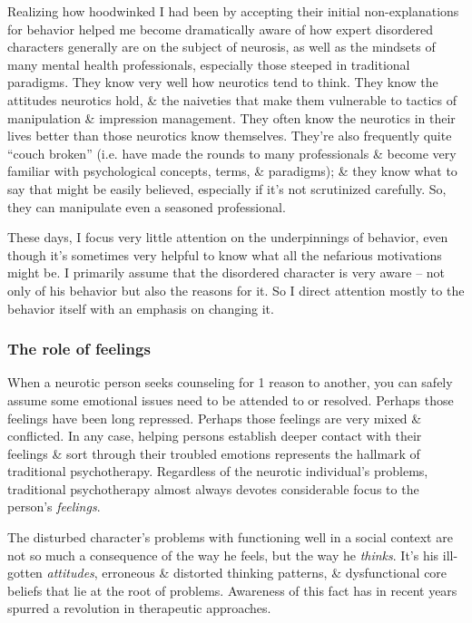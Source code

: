 \documentclass{article}
\numberwithin{equation}{section}
\begin{document}
Realizing how hoodwinked I had been by accepting their initial non-explanations for behavior helped me become dramatically aware of how expert disordered characters generally are on the subject of neurosis, as well as the mindsets of many mental health professionals, especially those steeped in traditional paradigms. They know very well how neurotics tend to think. They know the attitudes neurotics hold, \& the naiveties that make them vulnerable to tactics of manipulation \& impression management. They often know the neurotics in their lives better than those neurotics know themselves. They're also frequently quite ``couch broken'' (i.e. have made the rounds to many professionals \& become very familiar with psychological concepts, terms, \& paradigms); \& they know what to say that might be easily believed, especially if it's not scrutinized carefully. So, they can manipulate even a seasoned professional.

These days, I focus very little attention on the underpinnings of behavior, even though it's sometimes very helpful to know what all the nefarious motivations might be. I primarily assume that the disordered character is very aware -- not only of his behavior but also the reasons for it. So I direct attention mostly to the behavior itself with an emphasis on changing it.

\subsubsection{The role of feelings}
When a neurotic person seeks counseling for 1 reason to another, you can safely assume some emotional issues need to be attended to or resolved. Perhaps those feelings have been long repressed. Perhaps those feelings are very mixed \& conflicted. In any case, helping persons establish deeper contact with their feelings \& sort through their troubled emotions represents the hallmark of traditional psychotherapy. Regardless of the neurotic individual's problems, traditional psychotherapy almost always devotes considerable focus to the person's \textit{feelings}.
	
The disturbed character's problems with functioning well in a social context are not so much a consequence of the way he feels, but the way he \textit{thinks}. It's his ill-gotten \textit{attitudes}, erroneous \& distorted thinking patterns, \& dysfunctional core beliefs that lie at the root of problems. Awareness of this fact has in recent years spurred a revolution in therapeutic approaches.
\end{document}
